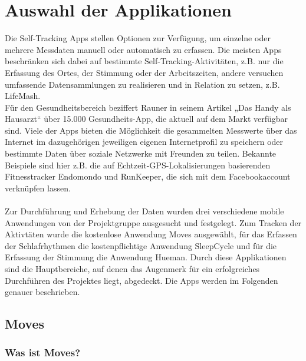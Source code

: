 
\chapter{Auswahl der Applikationen}
\label{ch:Apps}

Die Self-Tracking Apps stellen Optionen zur Verfügung, um einzelne oder mehrere Messdaten manuell oder automatisch zu erfassen. 
Die meisten Apps beschränken sich dabei auf bestimmte Self-Tracking-Aktivitäten, z.B. nur die Erfassung des Ortes, der Stimmung oder der Arbeitszeiten, andere versuchen umfassende Datensammlungen zu realisieren und in Relation zu setzen, z.B. LifeMash. \cite{web:SleepCycle} 
\\
Für den Gesundheitsbereich beziffert Rauner in seinem Artikel „Das Handy als Hausarzt“ über 15.000 Gesundheits-App, die aktuell auf dem Markt verfügbar sind.  \cite{web:Selbstvermesser}
Viele der Apps bieten die Möglichkeit die gesammelten Messwerte über das Internet im dazugehörigen jeweiligen eigenen Internetprofil zu speichern oder bestimmte Daten über soziale Netzwerke mit Freunden zu teilen. 
Bekannte Beispiele sind hier z.B. die auf Echtzeit-GPS-Lokalisierungen basierenden Fitnesstracker Endomondo und RunKeeper, die sich mit dem Facebookaccount verknüpfen lassen. 
\\
\\
Zur Durchführung und Erhebung der Daten wurden drei verschiedene mobile Anwendungen von der Projektgruppe ausgesucht und festgelegt.
Zum Tracken der Aktivtäten wurde die kostenlose Anwendung Moves ausgewählt, für das Erfassen der Schlafrhythmen die kostenpflichtige Anwendung SleepCycle und für die Erfassung der Stimmung die Anwendung Hueman.
Durch diese Applikationen sind die Hauptbereiche, auf denen das Augenmerk für ein erfolgreiches Durchführen des Projektes liegt, abgedeckt.
Die Apps werden im Folgenden genauer beschrieben.


\section{Moves}
\label{ch:Apps:sec:Moves}

\subsection{Was ist Moves?}
\label{ch:Apps:sec:Moves:subsec:WIM}

